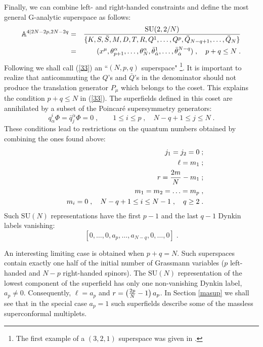 \documentclass[a4paper,12pt]{article}
\begin{document}
Finally, we can combine left- and right-handed constraints and 
define the most general G-analytic superspace as follows:
\begin{eqnarray}
 {\mathbb A}^{4\vert 2N-2p,2N-2q} &=& {\mbox{SU}(2,2/N)\over \{K,S,\bar 
S, M,D,T,R,Q^1,\ldots, Q^p,\bar Q_{N-q+1},\ldots, \bar Q_N\}} 
\nonumber\\ 
  &=& (x^\mu,\theta^{\alpha}_{p+1},\ldots,\theta^{\alpha}_N,
\bar\theta^1_{\dot\alpha}, \ldots, 
\bar\theta^{N-q}_{\dot\alpha})\;, \quad p+q\leq N \;.\label{33}  
\end{eqnarray}
Following \cite{hh} we shall call (\ref{33}) an ``$(N,p,q)$ 
superspace" \footnote{The first example of a $(3,2,1)$ superspace 
was given in \cite{GIK3}.}. It is important to realize that 
anticommuting the $Q$'s and $\bar Q$'s in the denominator should 
not produce the translation generator $P_\mu$ which belongs to the 
coset. This explains the condition $p+q\leq N$ in (\ref{33}). The 
superfields defined in this coset are annihilated by a subset of 
the Poincar\'{e} supersymmetry generators: 
\begin{equation}\label{33'}
 q^i_\alpha \Phi = \bar q^{\dot\alpha}_j\Phi=0\;, \qquad 1\leq i 
\leq p\;, \quad N-q+1 \leq j \leq N\;.
\end{equation}
These conditions lead to restrictions on the quantum numbers 
obtained by combining the ones found above: 
\begin{eqnarray}
  &&j_1=j_2=0\;; \nonumber\\
  &&\ell=m_1\;; \nonumber\\
  && r={2m\over N}-m_1\;;\label{34}\\
  && m_1=m_2=\ldots=m_p\;,\nonumber\\
  && m_i=0\;, \quad N-q+1\leq i \leq N-1\;, \quad q\geq 2 \;. \nonumber
\end{eqnarray}
Such $\mbox{SU}(N)$ representations have the first $p-1$ and the 
last $q-1$ Dynkin labels vanishing: 
\begin{equation}\label{35}
  [0,\ldots,0,a_{p},\ldots,a_{N-q},0,\ldots,0]\;.
\end{equation}
   
An interesting limiting case is obtained when $p+q=N$. Such 
superspaces contain exactly one half of the initial number of 
Grassmann variables ($p$ left-handed and $N-p$ right-handed 
spinors). The $\mbox{SU}(N)$ representation of the lowest 
component of the superfield has only one non-vanishing Dynkin 
label, $a_p\neq0$. Consequently, $\ell = a_p$ and 
$r=\left({2p\over N}-1 \right)a_p$. In Section \ref{masup} we 
shall see that in the special case $a_p=1$ such superfields 
describe some of the massless superconformal multiplets. 
\end{document}
